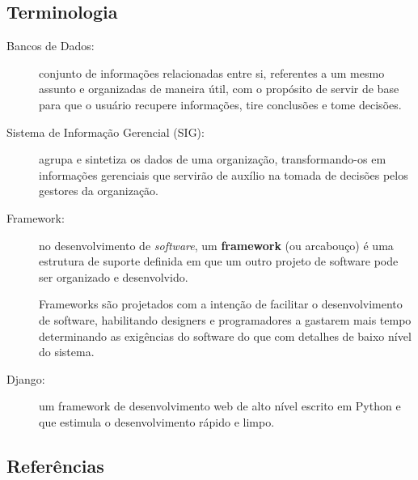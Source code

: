\subsection{Terminologia}
\begin{description}
\item[Bancos de Dados:] conjunto de informações relacionadas entre
  si, referentes a um mesmo assunto e organizadas de maneira útil, com
  o propósito de servir de base para que o usuário recupere
  informações, tire conclusões e tome decisões.
\item[Sistema de Informação Gerencial (SIG):] agrupa e sintetiza os
  dados de uma organização, transformando-os em informações gerenciais
  que servirão de auxílio na tomada de decisões pelos gestores da
  organização.
\item[Framework:] no desenvolvimento de \textit{software}, um
  \textbf{framework} (ou arcabouço) é uma estrutura de suporte
  definida em que um outro projeto de software pode ser organizado e
  desenvolvido.

  Frameworks são projetados com a intenção de facilitar o
  desenvolvimento de software, habilitando designers e programadores a
  gastarem mais tempo determinando as exigências do software do que
  com detalhes de baixo nível do sistema.
\item[Django:] um framework de desenvolvimento web de alto nível
  escrito em Python e que estimula o desenvolvimento rápido e limpo.
\end{description}

\subsection{Referências}

%
%
